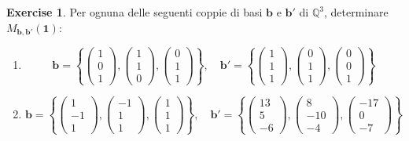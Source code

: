 \documentclass{article}
\theoremstyle{plain}
\theoremstyle{definition}
\newtheorem{xca}[exmp]{Exercise}
\theoremstyle{remark}
\begin{document}
\vspace{10pt}

\begin{bxthm}
\begin{xca}
    Per ognuna delle seguenti coppie di basi \( \mathbf{b} \) e \( \mathbf{b}' \) di \( \mathbb{Q}^3 \), determinare \( M_{\mathbf{b},\mathbf{b}'}(\mathbf{1}) \):
\begin{enumerate}
    \item \[ \mathbf{b} = \left\{\begin{pmatrix}1\\0\\1\end{pmatrix}, \begin{pmatrix}1\\1\\0\end{pmatrix}, \begin{pmatrix}0\\1\\1\end{pmatrix}\right\}, \quad  \mathbf{b}' = \left\{\begin{pmatrix}1\\1\\1\end{pmatrix}, \begin{pmatrix}0\\1\\1\end{pmatrix}, \begin{pmatrix}0\\0\\1\end{pmatrix} \right\} \]
    \item \[ \mathbf{b} = \left\{\begin{pmatrix}1\\ -1 \\1\end{pmatrix}, \begin{pmatrix}-1\\ 1\\1\end{pmatrix}, \begin{pmatrix}1\\ 1\\1\end{pmatrix} \right\}, \quad \mathbf{b}' =   \left\{\begin{pmatrix}13\\ 5\\-6\end{pmatrix}, \begin{pmatrix}8\\-10\\-4\end{pmatrix}, \begin{pmatrix}-17\\0\\-7\end{pmatrix}\right\} \]
\end{enumerate}
\end{xca}
\end{bxthm}
\end{document}
